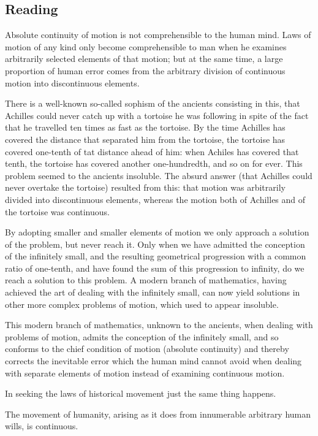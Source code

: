


\subsection*{Reading}
Absolute continuity of motion is not comprehensible to the human mind. Laws of motion of any kind only become comprehensible to man when he examines arbitrarily selected elements of that motion; but at the same time, a large proportion of human error comes from the arbitrary division of continuous motion into discontinuous elements.

There is a well-known so-called sophism of the ancients consisting in this, that Achilles could never catch up with a tortoise he was following in spite of the fact that he travelled ten times as fast as the tortoise. By the time Achilles has covered the distance that separated him from the tortoise, the tortoise has covered one-tenth of tat distance ahead of him: when Achiles has covered that tenth, the tortoise has covered another one-hundredth, and so on for ever. This problem seemed to the ancients insoluble. The absurd answer (that Achilles could never overtake the tortoise) resulted from this: that motion was arbitrarily divided into discontinuous elements, whereas the motion both of Achilles and of the tortoise was continuous.

By adopting smaller and smaller elements of motion we only approach a solution of the problem, but never reach it. Only when we have admitted the conception of the infinitely small, and the resulting geometrical progression with a common ratio of one-tenth, and have found the sum of this progression to infinity, do we reach a solution to this problem. A modern branch of mathematics, having achieved the art of dealing with the infinitely small, can now yield solutions in other more complex problems of motion, which used to appear insoluble.

This modern branch of mathematics, unknown to the ancients, when dealing with problems of motion, admits the conception of the infinitely small, and so conforms to the chief condition of motion (absolute continuity) and thereby corrects the inevitable error which the human mind cannot avoid when dealing with separate elements of motion instead of examining continuous motion.

In seeking the laws of historical movement just the same thing happens.

The movement of humanity, arising as it does from innumerable arbitrary human wills, is continuous.

